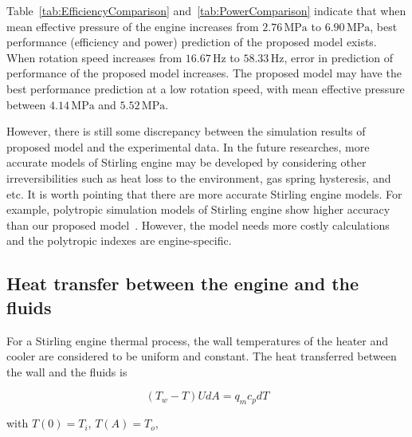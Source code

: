 \documentclass[review,3p,10t]{elsarticle}
\begin{document}
Table~\ref{tab:EfficiencyComparison} and~\ref{tab:PowerComparison} indicate that when mean effective pressure of the engine increases from $2.76\,\mathrm{MPa}$ to $6.90\,\mathrm{MPa}$, best performance (efficiency and power) prediction of the proposed model exists. When rotation speed increases from $16.67\,\mathrm{Hz}$ to $58.33\,\mathrm{Hz}$, error in prediction of performance of the proposed model increases. The proposed model may have the best performance prediction at a low rotation speed, with mean effective pressure between $4.14\,\mathrm{MPa}$ and $5.52\,\mathrm{MPa}$.

However, there is still some discrepancy between the simulation results of proposed model and the experimental data. In the future researches, more accurate models of Stirling engine may be developed by considering other irreversibilities such as heat loss to the environment, gas spring hysteresis, and etc. It is worth pointing that there are more accurate Stirling engine models. For example, polytropic simulation models of Stirling engine show higher accuracy than our proposed model~\cite{Hosseinzade2015, Babaelahi2015}. However, the model needs more costly calculations and the polytropic indexes are engine-specific.

\subsection{Heat transfer between the engine and the fluids}

For a Stirling engine thermal process, the wall temperatures of the heater and cooler are considered to be uniform and constant. The heat transferred between the wall and the fluids is

\begin{equation}
	(T_w-T)UdA = q_mc_pdT
\end{equation}

with $T(0)=T_i$, $T(A)=T_o$,
\end{document}

